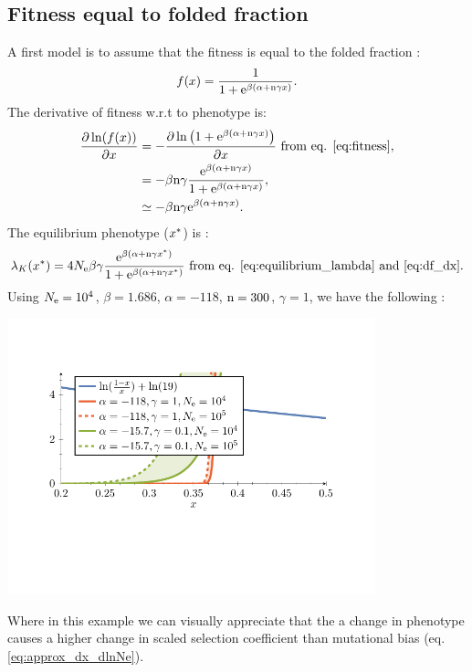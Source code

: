 \documentclass{article}
\begin{document}
\subsection{Fitness equal to folded fraction}
A first model is to assume that the fitness is equal to the folded fraction \citep{Goldstein2013}:
\begin{gather}
f(x) = \frac{1}{1 + \mathrm{e}^{\beta(\alpha + \text{n} \gamma x)}}. \label{eq:fitness}
\end{gather}
The derivative of fitness w.r.t to phenotype is:
\begin{align}
\frac{\partial \ln (f(x))}{\partial x}  & = - \frac{\partial \ln \left( 1 + \mathrm{e}^{\beta(\alpha + \text{n} \gamma x)} \right)}{\partial x} \text{ from eq. \ref{eq:fitness}}, \\
& = - \beta \text{n} \gamma \frac{\mathrm{e}^{\beta(\alpha + \text{n} \gamma x)}}{1 + \mathrm{e}^{\beta(\alpha + \text{n} \gamma x)}} \label{eq:df_dx},\\
& \simeq - \beta \text{n} \gamma \mathrm{e}^{\beta(\alpha + \text{n} \gamma x)}.
\end{align}
The equilibrium phenotype ($x^{*}$) is :
\begin{gather}
\lambda_{K}(x^{*}) = 4N_{\mathrm{e}} \beta \gamma \frac{\mathrm{e}^{\beta(\alpha + \text{n} \gamma x^{*})}}{1 + \mathrm{e}^{\beta(\alpha + \text{n} \gamma x^{*})}}  \text{ from eq. \ref{eq:equilibrium_lambda} and \ref{eq:df_dx}}.
\end{gather}
Using $N_{\mathrm{e}}=10^4$, $\beta=1.686$, $\alpha = -118$, $\text{n}=300$, $\gamma=1$, we have the following :
\begin{center}
\includegraphics[width=0.8\textwidth, page=4] {figures.pdf}
\end{center}
Where in this example we can visually appreciate that the a change in phenotype causes a higher change in scaled selection coefficient than mutational bias (eq. \ref{eq:approx_dx_dlnNe}).
\end{document}
